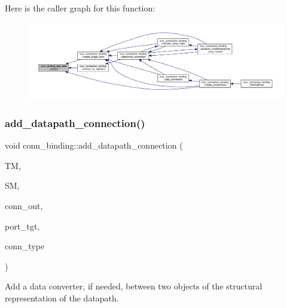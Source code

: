 Here is the caller graph for this function\+:
\nopagebreak
\begin{figure}[H]
\begin{center}
\leavevmode
\includegraphics[width=350pt]{d2/db1/classconn__binding_a43c6611fbbb3ee279fb4a87c1940a0a1_icgraph}
\end{center}
\end{figure}
\mbox{\label{classconn__binding_a9b8d9e4a2740b3cef8f4242be0c06dda}} 
\subsubsection{\texorpdfstring{add\+\_\+datapath\+\_\+connection()}{add\_datapath\_connection()}}
{\footnotesize\ttfamily void conn\+\_\+binding\+::add\+\_\+datapath\+\_\+connection (\begin{DoxyParamCaption}\item[{const \hyperlink{technology__manager_8hpp_a4b9ecd440c804109c962654f9227244e}{technology\+\_\+manager\+Ref}}]{TM,  }\item[{const \hyperlink{structural__manager_8hpp_ab3136f0e785d8535f8d252a7b53db5b5}{structural\+\_\+manager\+Ref}}]{SM,  }\item[{const \hyperlink{structural__objects_8hpp_a8ea5f8cc50ab8f4c31e2751074ff60b2}{structural\+\_\+object\+Ref}}]{conn\+\_\+out,  }\item[{const \hyperlink{structural__objects_8hpp_a8ea5f8cc50ab8f4c31e2751074ff60b2}{structural\+\_\+object\+Ref}}]{port\+\_\+tgt,  }\item[{unsigned int}]{conn\+\_\+type }\end{DoxyParamCaption})\hspace{0.3cm}{\ttfamily [protected]}}



Add a data converter, if needed, between two objects of the structural representation of the datapath. 

